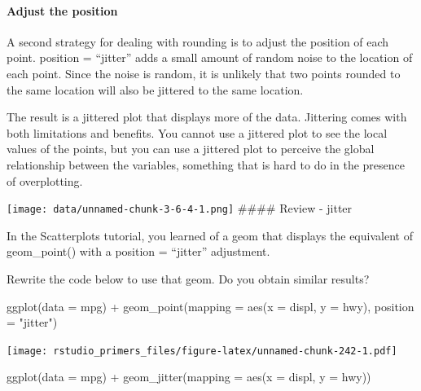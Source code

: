 \documentclass[
]{article}
\newenvironment{Shaded}{\begin{snugshade}}{\end{snugshade}}
\newcommand{\AttributeTok}[1]{\textcolor[rgb]{0.77,0.63,0.00}{#1}}
\newcommand{\FunctionTok}[1]{\textcolor[rgb]{0.00,0.00,0.00}{#1}}
\newcommand{\NormalTok}[1]{#1}
\newcommand{\SpecialCharTok}[1]{\textcolor[rgb]{0.00,0.00,0.00}{#1}}
\newcommand{\StringTok}[1]{\textcolor[rgb]{0.31,0.60,0.02}{#1}}
\begin{document}
\hypertarget{adjust-the-position}{%
\paragraph{Adjust the position}\label{adjust-the-position}}

A second strategy for dealing with rounding is to adjust the position of
each point. position = ``jitter'' adds a small amount of random noise to
the location of each point. Since the noise is random, it is unlikely
that two points rounded to the same location will also be jittered to
the same location.

The result is a jittered plot that displays more of the data. Jittering
comes with both limitations and benefits. You cannot use a jittered plot
to see the local values of the points, but you can use a jittered plot
to perceive the global relationship between the variables, something
that is hard to do in the presence of overplotting.

\texttt{[image: data/unnamed-chunk-3-6-4-1.png]} \#\#\#\# Review -
jitter

In the Scatterplots tutorial, you learned of a geom that displays the
equivalent of geom\_point() with a position = ``jitter'' adjustment.

Rewrite the code below to use that geom. Do you obtain similar results?

\begin{Shaded}
\begin{Highlighting}[]
\FunctionTok{ggplot}\NormalTok{(}\AttributeTok{data =}\NormalTok{ mpg) }\SpecialCharTok{+}
  \FunctionTok{geom\_point}\NormalTok{(}\AttributeTok{mapping =} \FunctionTok{aes}\NormalTok{(}\AttributeTok{x =}\NormalTok{ displ, }\AttributeTok{y =}\NormalTok{ hwy), }\AttributeTok{position =} \StringTok{"jitter"}\NormalTok{)}
\end{Highlighting}
\end{Shaded}

\texttt{[image: rstudio\_primers\_files/figure-latex/unnamed-chunk-242-1.pdf]}

\begin{Shaded}
\begin{Highlighting}[]
\FunctionTok{ggplot}\NormalTok{(}\AttributeTok{data =}\NormalTok{ mpg) }\SpecialCharTok{+}
  \FunctionTok{geom\_jitter}\NormalTok{(}\AttributeTok{mapping =} \FunctionTok{aes}\NormalTok{(}\AttributeTok{x =}\NormalTok{ displ, }\AttributeTok{y =}\NormalTok{ hwy))}
\end{Highlighting}
\end{Shaded}
\end{document}
